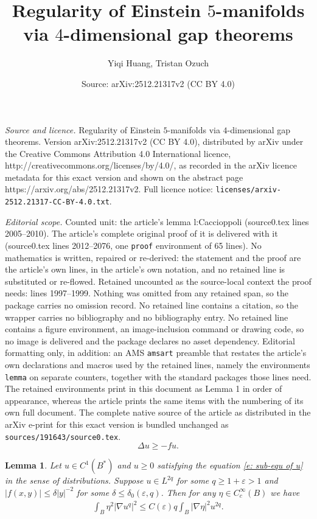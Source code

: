 \documentclass[10pt,a4paper]{amsart}
\title{Regularity of Einstein $5$-manifolds via $4$-dimensional gap theorems}
\author{Yiqi Huang, Tristan Ozuch}
\date{Source: arXiv:2512.21317v2 (CC BY 4.0)}
\newtheorem{lemma}{Lemma}
\begin{document}
\maketitle

\noindent\emph{Source and licence.} Regularity of Einstein $5$-manifolds via $4$-dimensional gap theorems. Version arXiv:2512.21317v2 (CC BY 4.0), distributed by arXiv under the Creative Commons Attribution 4.0 International licence, http://creativecommons.org/licenses/by/4.0/, as recorded in the arXiv licence metadata for this exact version and shown on the abstract page https://arxiv.org/abs/2512.21317v2. Full licence notice: \texttt{licenses/arxiv-2512.21317-CC-BY-4.0.txt}.\par\smallskip

\noindent\textit{Editorial scope.} Counted unit: the article's lemma l:Caccioppoli (source0.tex lines 2005--2010). The article's complete original proof of it is delivered with it (source0.tex lines 2012--2076, one \texttt{proof} environment of 65 lines). No mathematics is written, repaired or re-derived: the statement and the proof are the article's own lines, in the article's own notation, and no retained line is substituted or re-flowed.  Retained uncounted as the source-local context the proof needs: lines 1997--1999.  Nothing was omitted from any retained span, so the package carries no omission record.  No retained line contains a citation, so the wrapper carries no bibliography and no bibliography entry.  No retained line contains a figure environment, an image-inclusion command or drawing code, so no image is delivered and the package declares no asset dependency.  Editorial formatting only, in addition: an AMS \texttt{amsart} preamble that restates the article's own declarations and macros used by the retained lines, namely the environments \texttt{lemma} on separate counters, together with the standard packages those lines need.  The retained environments print in this document as Lemma 1 in order of appearance, whereas the article prints the same items with the numbering of its own full document.  The complete native source of the article as distributed in the arXiv e-print for this exact version is bundled unchanged as \texttt{sources/191643/source0.tex}.
\begin{equation}\label{e: sub-equ of u}
    \Delta u \geqslant - f u. 
\end{equation}

\begin{lemma}\label{l:Caccioppoli}
    Let $u \in C^1(B^*)$ and $u \geqslant 0$ satisfying the equation \eqref{e: sub-equ of u} in the sense of distributions. Suppose $u \in L^{2q}$ for some $q \geqslant 1 + \varepsilon >1$ and $|f(x,y) | \leqslant \delta |y|^{-2}$ for some $\delta \leqslant \delta_0(\varepsilon,q)$. Then for any $\eta \in C^{\infty}_c(B)$ we have
    \begin{align}\label{e:Cacchio-1}
        \int_B \eta^2 |\nabla u^q|^2 \leqslant C(\varepsilon) q \int_B |\nabla \eta|^2 u^{2q}.
    \end{align}
\end{lemma}
\end{document}
